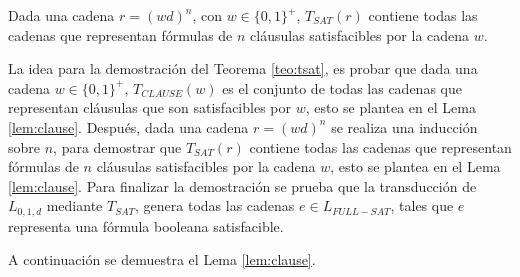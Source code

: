 \begin{lemma}
    \label{lem:sat}
    Dada una cadena $r=(wd)^n$, con $w\in\{0,1\}^+$, $T_{SAT}(r)$ contiene todas las cadenas que representan fórmulas de $n$ cláusulas satisfacibles por la cadena $w$.
\end{lemma}

La idea para la demostración del Teorema \ref{teo:tsat}, es probar que dada una cadena $w\in \{0,1\}^+$, 
$T_{CLAUSE}(w)$ es el conjunto de todas las cadenas que representan cláusulas que son satisfacibles por $w$, 
esto se plantea en el Lema \ref{lem:clause}. Después, dada una cadena $r=(wd)^n$ se realiza una inducción 
sobre $n$, para demostrar que $T_{SAT}(r)$ contiene todas las cadenas que representan fórmulas de $n$
cláusulas satisfacibles por la cadena $w$, esto se plantea en el Lema \ref{lem:clause}.  
Para finalizar la demostración se prueba que la transducción de $L_{0,1,d}$ mediante $T_{SAT}$, 
genera todas las cadenas $e\in L_{FULL-SAT}$, tales que $e$ representa una fórmula booleana 
satisfacible.

A continuación se demuestra el Lema \ref{lem:clause}.

